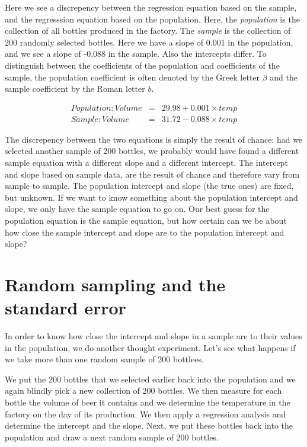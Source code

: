 \documentclass[]{report}\usepackage[]{graphicx}\usepackage[]{color}
\begin{document}
Here we see a discrepency between the regression equation based on the sample, and the regresssion equation based on the population. Here, the \textit{population} is the collection of all bottles produced in the factory. The \textit{sample} is the collection of 200 randomly selected bottles. Here we have a slope of 0.001 in the population, and we see a slope of -0.088 in the sample. Also the intercepts differ. To distinguish between the coefficients of the population and coefficients of the sample, the population coefficient is often denoted by the Greek letter $\beta$ and the sample coefficient by the Roman letter $b$.



\begin{eqnarray}
Population: Volume &=& 29.98 + 0.001 \times temp  \nonumber\\
Sample: Volume &=&  31.72  -0.088 \times temp \nonumber
\end{eqnarray}

The discrepency between the two equations is simply the result of chance: had we selected another sample of 200 bottles, we probably would have found a different sample equation with a different slope and a different intercept. The intercept and slope based on sample data, are the result of chance and therefore vary from sample to sample. The population intercept and slope (the true ones) are fixed, but unknown. If we want to know something about the population intercept and slope, we only have the sample equation to go on. Our best guess for the population equation is the sample equation, but how certain can we be about how close the sample intercept and slope are to the population intercept and slope?


\section{Random sampling and the standard error}


In order to know how close the intercept and slope in a sample are to their values in the population, we do another thought experiment. Let's see what happens if we take more than one random sample of 200 bottlees. 

We put the 200 bottles that we selected earlier back into the population and we again blindly pick a new collection of 200 bottles. We then measure for each bottle the volume of beer it contains and we determine the temperature in the factory on the day of its production. We then apply a regression analysis and determine the intercept and the slope. Next, we put these bottles back into the population and draw a next random sample of 200 bottles.
\end{document}
